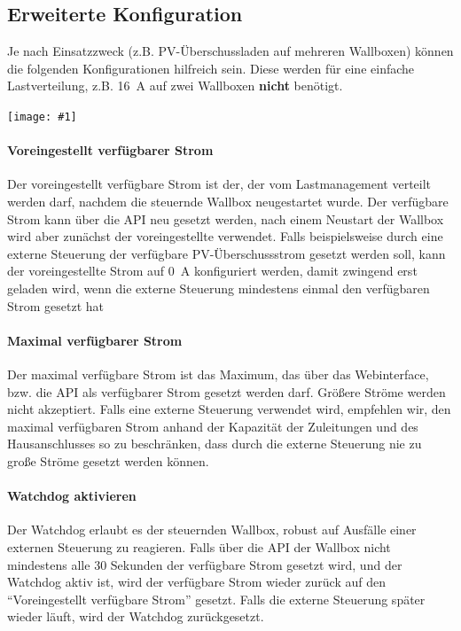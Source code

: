 \documentclass[a4paper,10pt]{article}
\newcommand{\gfx}[1]{\texttt{[image: \#1]}}
\begin{document}
\begin{multicols*}{2}
	\subsection{Erweiterte Konfiguration}
	Je nach Einsatzzweck (z.B. PV-Überschussladen auf mehreren Wallboxen) können die folgenden Konfigurationen hilfreich sein.
	Diese werden für eine einfache Lastverteilung, z.B. \SI{16}{\ampere} auf zwei Wallboxen \textbf{nicht} benötigt.

	\gfx{./img/resized/web_charge_manager}

	\paragraph{Voreingestellt verfügbarer Strom}
	Der voreingestellt verfügbare Strom ist der, der vom Lastmanagement verteilt werden darf, nachdem die steuernde Wallbox
	neugestartet wurde. Der verfügbare Strom kann über die API neu gesetzt werden, nach einem Neustart der Wallbox wird aber
	zunächst der voreingestellte verwendet. Falls beispielsweise durch eine externe Steuerung der verfügbare PV-Überschussstrom
	gesetzt werden soll, kann der voreingestellte Strom auf \SI{0}{\ampere} konfiguriert werden, damit zwingend erst geladen wird,
	wenn die externe Steuerung mindestens einmal den verfügbaren Strom gesetzt hat

	\paragraph{Maximal verfügbarer Strom}
	Der maximal verfügbare Strom ist das Maximum, das über das Webinterface, bzw. die API als verfügbarer Strom gesetzt werden darf.
	Größere Ströme werden nicht akzeptiert. Falls eine externe Steuerung verwendet wird, empfehlen wir, den maximal verfügbaren Strom
	anhand der Kapazität der Zuleitungen und des Hausanschlusses so zu beschränken, dass durch die externe Steuerung nie zu große
	Ströme gesetzt werden können.

	\paragraph{Watchdog aktivieren}
	Der Watchdog erlaubt es der steuernden Wallbox, robust auf Ausfälle einer externen Steuerung zu reagieren. Falls über die API der Wallbox
	nicht mindestens alle 30 Sekunden der verfügbare Strom gesetzt wird, und der Watchdog aktiv ist, wird der verfügbare Strom wieder zurück auf den
	\enquote{Voreingestellt verfügbare Strom} gesetzt. Falls die externe Steuerung später wieder läuft, wird der Watchdog zurückgesetzt.


\end{multicols*}
\end{document}
